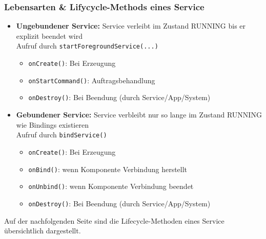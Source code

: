 \documentclass[a4paper]{article}
\begin{document}
		\subsubsection{Lebensarten \& Lifycycle-Methods eines Service}

		\begin{itemize}
			
			\item \textbf{Ungebundener Service:} Service verleibt im Zustand RUNNING bis er explizit beendet wird \\
			Aufruf durch \texttt{startForegroundService(...)}
			\begin{itemize}
				
				\item \texttt{onCreate()}: Bei Erzeugung
				\item \texttt{onStartCommand()}: Auftragsbehandlung
				\item \texttt{onDestroy()}: Bei Beendung (durch Service/App/System)
				
			\end{itemize}
			
			\item \textbf{Gebundener Service:} Service verbleibt nur so lange im Zustand RUNNING wie Bindings existieren\\
			Aufruf durch \texttt{bindService()}
			\begin{itemize}
				
				\item \texttt{onCreate()}: Bei Erzeugung
				\item \texttt{onBind()}: wenn Komponente Verbindung herstellt
				\item \texttt{onUnbind()}: wenn Komponente Verbindung beendet
				\item \texttt{onDestroy()}: Bei Beendung (durch Service/App/System)
				
			\end{itemize}
			
		\end{itemize}
		\vspace{1em}
		Auf der nachfolgenden Seite sind die Lifecycle-Methoden eines Service übersichtlich dargestellt.
		
		\newpage
\end{document}
